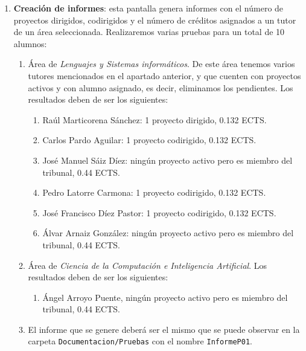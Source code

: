 \begin{enumerate}
	
	\item \textbf{Creación de informes}: esta pantalla genera informes con el número de proyectos dirigidos, codirigidos y el número de créditos asignados a un tutor de un área seleccionada. Realizaremos varias pruebas para un total de 10 alumnos:
		\begin{enumerate}
			\item Área de \emph{Lenguajes y Sistemas informáticos}. De este área tenemos varios tutores mencionados en el apartado anterior, y que cuenten con proyectos activos y con alumno asignado, es decir, eliminamos los pendientes. Los resultados deben de ser los siguientes:
				\begin{enumerate}
					\item Raúl Marticorena Sánchez: 1 proyecto dirigido, 0.132 ECTS.
					\item Carlos Pardo Aguilar: 1 proyecto codirigido, 0.132 ECTS.					
					\item José Manuel Sáiz Díez: ningún proyecto activo pero es miembro del tribunal, 0.44 ECTS.
					\item Pedro Latorre Carmona: 1 proyecto codirigido, 0.132 ECTS.						
					\item José Francisco Díez Pastor: 1 proyecto codirigido, 0.132 ECTS.										
					\item Álvar Arnaiz González: ningún proyecto activo pero es miembro del tribunal, 0.44 ECTS.					
				\end{enumerate}
			\item Área de \emph{Ciencia de la Computación e Inteligencia Artificial}. Los resultados deben de ser los siguientes:
			\begin{enumerate}
				\item Ángel Arroyo Puente, ningún proyecto activo pero es miembro del tribunal, 0.44 ECTS.							
			\end{enumerate}
			\item El informe que se genere deberá ser el mismo que se puede observar en la carpeta \texttt{Documentacion/Pruebas} con el nombre \texttt{InformeP01}.
		\end{enumerate}


\end{enumerate}
